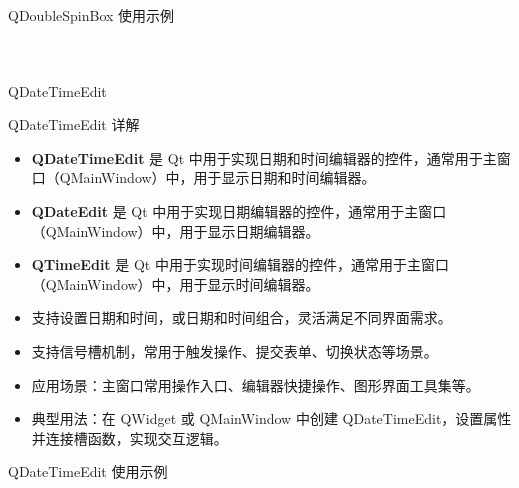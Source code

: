 \documentclass[UTF8,aspectratio=169]{beamer}
\begin{document}
\begin{frame}[fragile]{QDoubleSpinBox 使用示例}
    \begin{columns}
        \begin{column}{0.48\textwidth}
            \inputminted[firstline=1,lastline=17]{cpp}{code/qt_doublespinbox_example.cpp}
        \end{column}
        \begin{column}{0.48\textwidth}
            \inputminted[firstline=18,lastline=34]{cpp}{code/qt_doublespinbox_example.cpp}
        \end{column}
    \end{columns}
\end{frame}

\begin{frame}{QDateTimeEdit}
    \begin{ytublock}{QDateTimeEdit 详解}
        \begin{itemize}
            \item \textbf{QDateTimeEdit} 是 Qt 中用于实现日期和时间编辑器的控件，通常用于主窗口（QMainWindow）中，用于显示日期和时间编辑器。
            \item \textbf{QDateEdit} 是 Qt 中用于实现日期编辑器的控件，通常用于主窗口（QMainWindow）中，用于显示日期编辑器。
            \item \textbf{QTimeEdit} 是 Qt 中用于实现时间编辑器的控件，通常用于主窗口（QMainWindow）中，用于显示时间编辑器。
            \item 支持设置日期和时间，或日期和时间组合，灵活满足不同界面需求。
            \item 支持信号槽机制，常用于触发操作、提交表单、切换状态等场景。
            \item 应用场景：主窗口常用操作入口、编辑器快捷操作、图形界面工具集等。
            \item 典型用法：在 QWidget 或 QMainWindow 中创建 QDateTimeEdit，设置属性并连接槽函数，实现交互逻辑。
        \end{itemize}
    \end{ytublock}
\end{frame}

\begin{frame}[fragile]{QDateTimeEdit 使用示例}
    \begin{columns}
        \begin{column}{0.48\textwidth}
            \inputminted[firstline=15,lastline=28]{cpp}{code/qt_datetimeedit_example.cpp}
        \end{column}
        \begin{column}{0.48\textwidth}
            \inputminted[firstline=29,lastline=45]{cpp}{code/qt_datetimeedit_example.cpp}
        \end{column}
    \end{columns}
\end{frame}
\end{document}
